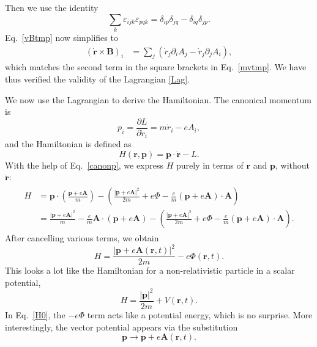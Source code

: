 \documentclass[prx,12pt]{revtex4-2}
\begin{document}
Then we use the identity
\begin{equation}
  \sum_k \varepsilon_{ijk} \varepsilon_{pqk}
  = \delta_{ip} \delta_{jq} - \delta_{iq} \delta_{jp}.
\end{equation}
Eq.~\eqref{vBtmp} now simplifies to
\begin{align}
  (\dot{\mathbf{r}} \times \mathbf{B})_i
  &= \sum_{j} \left( \dot{r}_j  \partial_i A_j - \dot{r}_j  \partial_j A_i\right),
\end{align}
which matches the second term in the square brackets in
Eq.~\eqref{mvtmp}.  We have thus verified the validity of the
Lagrangian \eqref{Lag}.

We now use the Lagrangian to derive the Hamiltonian.  The canonical
momentum is
\begin{equation}
  p_i = \frac{\partial L}{\partial \dot{r}_i} = m\dot{r}_i - e A_i,
  \label{canonp}
\end{equation}
and the Hamiltonian is defined as
\begin{equation}
  H(\mathbf{r},\mathbf{p}) = \mathbf{p} \cdot \dot{\mathbf{r}} - L.
\end{equation}
With the help of Eq.~\eqref{canonp}, we express $H$ purely in terms of
$\mathbf{r}$ and $\mathbf{p}$, without $\dot{\mathbf{r}}$:
\begin{align}
  \begin{aligned}
    H &= \mathbf{p}\cdot \left(\frac{\mathbf{p}+e\mathbf{A}}{m}\right)
    - \left(\frac{|\mathbf{p}+e\mathbf{A}|^2}{2m}
    + e\Phi - \frac{e}{m}(\mathbf{p}+e\mathbf{A})\cdot \mathbf{A}\right) \\
    &= \frac{|\mathbf{p}+e\mathbf{A}|^2}{m}
    - \frac{e}{m}\mathbf{A}\cdot \left(\mathbf{p}+e\mathbf{A}\right)
    - \left(\frac{|\mathbf{p}+e\mathbf{A}|^2}{2m}
    + e\Phi - \frac{e}{m}(\mathbf{p}+e\mathbf{A})\cdot \mathbf{A}\right).
  \end{aligned}
\end{align}
After cancelling various terms, we obtain
\begin{equation}
  H = \frac{|\mathbf{p}+e\mathbf{A}(\mathbf{r},t)|^2}{2m} - e\Phi(\mathbf{r},t).
  \label{H0}
\end{equation}
This looks a lot like the Hamiltonian for a non-relativistic particle
in a scalar potential,
\begin{equation*}
  H = \frac{|\mathbf{p}|^2}{2m} + V(\mathbf{r},t).
\end{equation*}
In Eq.~\eqref{H0}, the $-e\Phi$ term acts like a potential energy,
which is no surprise.  More interestingly, the vector potential
appears via the substitution
\begin{equation}
  \mathbf{p} \rightarrow \mathbf{p} + e\mathbf{A}(\mathbf{r},t).  
\end{equation}
\end{document}
